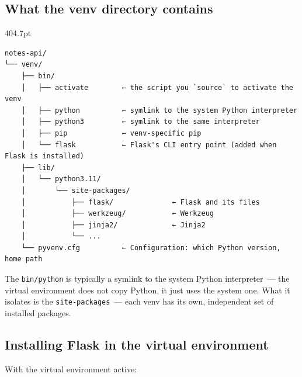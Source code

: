 \subsection*{What the venv directory contains}\label{06-local-dependencies:what-the-venv-directory-contains}

\begin{diagrambox}[short]{404.7pt}
\begin{Verbatim}[fontsize=\fontsize{9.0}{8.55}\selectfont]
notes-api/
└── venv/
    ├── bin/
    │   ├── activate        ← the script you `source` to activate the venv
    │   ├── python          ← symlink to the system Python interpreter
    │   ├── python3         ← symlink to the same interpreter
    │   ├── pip             ← venv-specific pip
    │   └── flask           ← Flask's CLI entry point (added when Flask is installed)
    ├── lib/
    │   └── python3.11/
    │       └── site-packages/
    │           ├── flask/              ← Flask and its files
    │           ├── werkzeug/           ← Werkzeug
    │           ├── jinja2/             ← Jinja2
    │           └── ...
    └── pyvenv.cfg          ← Configuration: which Python version, home path
\end{Verbatim}
\end{diagrambox}

\noindent{}The \texttt{bin/python} is typically a symlink to the system Python interpreter~--- the virtual environment does not copy Python, it just uses the system one. What it isolates is the \texttt{site-packages}~--- each venv has its own, independent set of installed packages.

\subsection*{Installing Flask in the virtual environment}\label{06-local-dependencies:installing-flask-in-the-virtual-environment}

With the virtual environment active:

\begin{codebox}[short]

\begin{Shaded}
\begin{Highlighting}[]
\end{Highlighting}
\end{Shaded}

\end{codebox}

